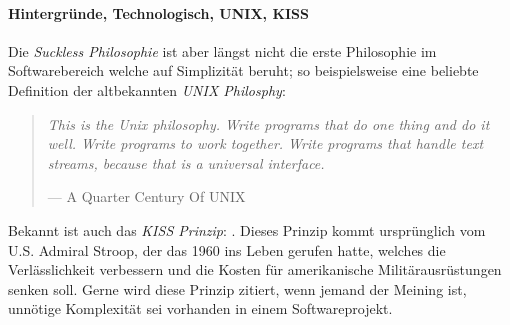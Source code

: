 \documentclass[a4paper,11pt]{article}
\newenvironment{nicequote}[2]{
    \begin{center}\begin{quote}\textit{#1}\\\par\raggedleft--- {#2}
    }{
    \end{quote}\end{center}
}
\begin{document}
\newpage

\paragraph{Hintergründe, Technologisch, UNIX, KISS}
Die \textit{Suckless Philosophie} ist aber längst nicht die erste Philosophie im Softwarebereich welche auf Simplizität beruht; so beispielsweise eine beliebte Definition der altbekannten \textit{UNIX Philosphy}:

\begin{nicequote}{This is the Unix philosophy. Write programs that do one thing and do it well. Write programs to work together. Write programs that handle text streams, because that is a universal interface.}{A Quarter Century Of UNIX \cite{salus1994}}
\end{nicequote}

Bekannt ist auch das \textit{KISS Prinzip}: . Dieses Prinzip kommt ursprünglich vom U.S. Admiral Stroop, der das  1960 ins Leben gerufen hatte, welches die Verlässlichkeit verbessern und die Kosten für amerikanische Militärausrüstungen senken soll. \cite{dalzell2009} Gerne wird diese Prinzip zitiert, wenn jemand der Meining ist, unnötige Komplexität sei vorhanden in einem Softwareprojekt.
\end{document}
